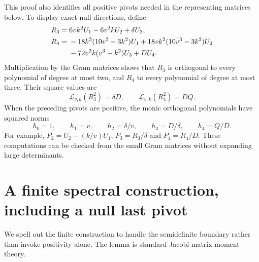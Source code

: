 \documentclass[11pt]{article}
\newcommand{\Lk}{\mathcal L_{v,k}}
\begin{document}
This proof also identifies all positive pivots needed in
the representing matrices below. To display exact null
directions, define
\begin{align}
 R_3={}&6vk^2U_1-6v^2kU_2+\delta U_3,\label{eq:R3}\\
 R_4={}&-18k^3(10v^3-3k^2)U_1
       +18vk^2(10v^3-3k^2)U_2\notag\\
       &-72v^2k(v^3-k^2)U_3+D U_4.\label{eq:R4}
\end{align}
Multiplication by the Gram matrices shows that $R_3$
is orthogonal to every polynomial of degree at most two,
and $R_4$ to every polynomial of degree at most three.
Their square values are
\begin{equation}\label{eq:nullnorms}
 \Lk(R_3^2)=\delta D,\qquad \Lk(R_4^2)=DQ.
\end{equation}
When the preceding pivots are positive, the monic
orthogonal polynomials have squared norms
\begin{equation}\label{eq:norms}
 h_0=1,\qquad h_1=v,\qquad h_2=\delta/v,
 \qquad h_3=D/\delta,\qquad h_4=Q/D.
\end{equation}
For example, $P_2=U_2-(k/v)U_1$, $P_3=R_3/\delta$
and $P_4=R_4/D$. These computations can be checked from
the small Gram matrices without expanding large determinants.

\section{A finite spectral construction, including a null last pivot}
We spell out the finite construction to handle the
semidefinite boundary rather than invoke positivity alone.
The lemma is standard Jacobi-matrix moment theory.
\end{document}
